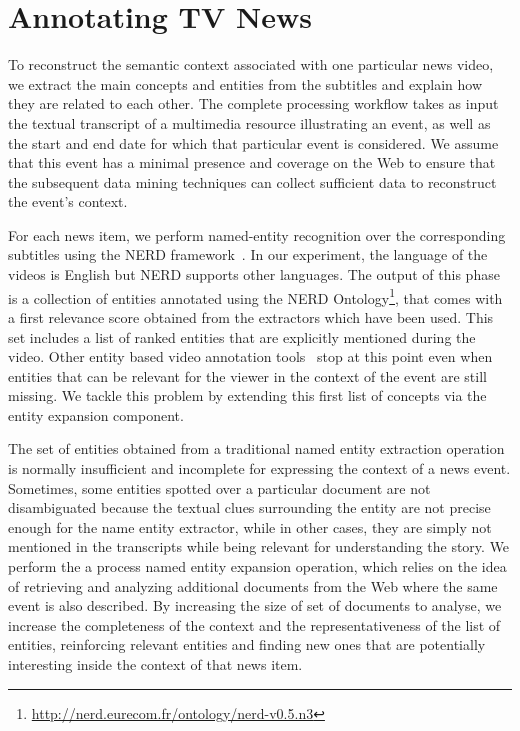 \documentclass{llncs}
\begin{document}

\section{Annotating TV News}
To reconstruct the semantic context associated with one particular news video, we extract the main concepts and entities from the subtitles and explain how they are related to each other. The complete processing workflow takes as input the textual transcript of a multimedia resource illustrating an event, as well as the start and end date for which that particular event is considered. We assume that this event has a minimal presence and coverage on the Web to ensure that the subsequent data mining techniques can collect sufficient data to reconstruct the event's context. 

For each news item, we perform named-entity recognition over the corresponding subtitles using the NERD framework~\cite{Rizzo2012b}. In our experiment, the language of the videos is English but NERD supports other languages. The output of this phase is a collection of entities annotated using the NERD Ontology\footnote{\fontsize{8pt}{1em}\selectfont \url{http://nerd.eurecom.fr/ontology/nerd-v0.5.n3}}, that comes with a first relevance score obtained from the extractors which have been used. This set includes a list of ranked entities that are explicitly mentioned during the video. Other entity based video annotation tools~\cite{yunjia2013} stop at this point even when entities that can be relevant for the viewer in the context of the event are still missing. We tackle this problem by extending this first list of concepts via the entity expansion component.

The set of entities obtained from a traditional named entity extraction operation is normally insufficient and incomplete for expressing the context of a news event. Sometimes, some entities spotted over a particular document are not disambiguated because the textual clues surrounding the entity are not precise enough for the name entity extractor, while in other cases, they are simply not mentioned in the transcripts while being relevant for understanding the story. We perform the a process named entity expansion operation, which relies on the idea of retrieving and analyzing additional documents from the Web where the same event is also described. By increasing the size of set of documents to analyse, we increase the completeness of the context and the representativeness of the list of entities, reinforcing relevant entities and finding new ones that are potentially interesting inside the context of that news item.
\end{document}
